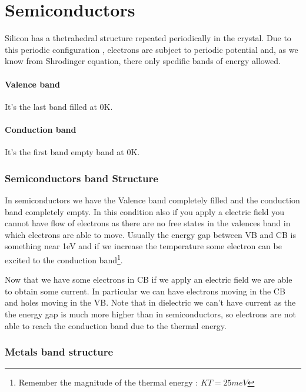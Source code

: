 \chapter{Semiconductors}
	\label{semiconductors}

	Silicon has a thetrahedral structure repeated periodically in the crystal.
	Due to this periodic configuration , electrons are subject to periodic potential and, as we know from Shrodinger equation, there only spedific bands of energy allowed.

	\subsubsection{Valence band}
		
		It's the last band filled at 0K.
	
	\subsubsection{Conduction band}
	
		It's the first band empty band at 0K.
	
	\subsection{Semiconductors band Structure}
	
		In semiconductors we have the Valence band completely filled and the conduction band completely empty.
		In this condition also if you apply a electric field you cannot have flow of electrons as there are no free states in the valences band in which electrons are able to move.
		Usually the energy gap between VB and CB is something near 1eV and if we increase the temperature some electron can be excited to the conduction band\footnote{Remember the magnitude of the thermal energy : $KT=25meV$}.

		Now that we have some electrons in CB if we apply an electric field we are able to obtain some current.
		In particular we can have electrons moving in the CB and holes moving in the VB.
		Note that in dielectric we can't have current as the the energy gap is much more higher than in semiconductors, so electrons are not able to reach the conduction band due to the thermal energy.

	\subsection{Metals band structure}
	
